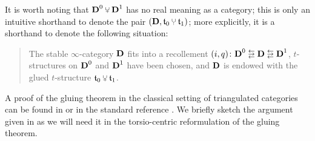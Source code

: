 \begin{notat}
\label{notat:recdec}
It is worth noting that $\D^0\glue \D^1$ has no real meaning as a category; this is only an intuitive shorthand to denote the pair $(\D,\tee_0\glue\tee_1)$; \marginnote{\dbend} more explicitly, it is a shorthand to denote the following situation:
\begin{quote}
The stable $\infty$\hyp{}category $\textbf{D}$ fits into a recollement $(i,q)\colon \D^0\lrlarrows \D \lrlarrows \D^1$, $t$\hyp{}structures on $\textbf{D}^0$ and $\textbf{D}^1$ have been chosen, and $\textbf{D}$ is endowed with the glued $t$\hyp{}structure $\tee_0\glue \tee_1$.
\end{quote}
\end{notat}
A proof of the gluing theorem in the classical setting of triangulated categories can be found in \cite[Thm. \textbf{7.2.2}]{Banagl} or in the standard reference \cite{BBDPervers}. We briefly sketch the argument given in \cite{Banagl} as we will need it in the torsio\hyp{}centric reformulation of the gluing theorem. 
